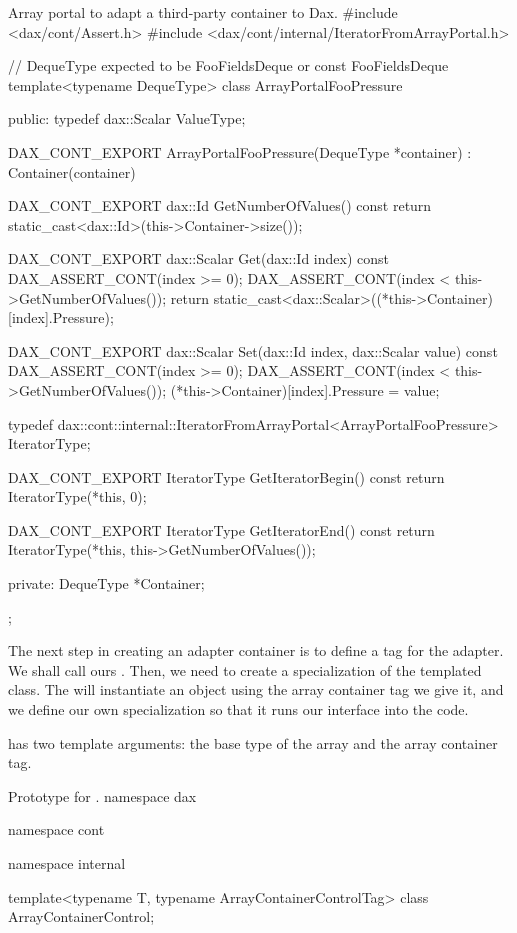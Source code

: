 \begin{daxexample}[ex:ArrayPortalAdapter]{Array portal to adapt a third-party container to Dax.}
#include <dax/cont/Assert.h>
#include <dax/cont/internal/IteratorFromArrayPortal.h>

// DequeType expected to be FooFieldsDeque or const FooFieldsDeque
template<typename DequeType>
class ArrayPortalFooPressure
{
public:
  typedef dax::Scalar ValueType;

  DAX_CONT_EXPORT
  ArrayPortalFooPressure(DequeType *container) : Container(container) {  }

  DAX_CONT_EXPORT
  dax::Id GetNumberOfValues() const {
    return static_cast<dax::Id>(this->Container->size());
  }

  DAX_CONT_EXPORT
  dax::Scalar Get(dax::Id index) const {
    DAX_ASSERT_CONT(index >= 0);
    DAX_ASSERT_CONT(index < this->GetNumberOfValues());
    return static_cast<dax::Scalar>((*this->Container)[index].Pressure);
  }

  DAX_CONT_EXPORT
  dax::Scalar Set(dax::Id index, dax::Scalar value) const {
    DAX_ASSERT_CONT(index >= 0);
    DAX_ASSERT_CONT(index < this->GetNumberOfValues());
    (*this->Container)[index].Pressure = value;
  }

  typedef dax::cont::internal::IteratorFromArrayPortal<ArrayPortalFooPressure> IteratorType;

  DAX_CONT_EXPORT
  IteratorType GetIteratorBegin() const {
    return IteratorType(*this, 0);
  }

  DAX_CONT_EXPORT
  IteratorType GetIteratorEnd() const {
    return IteratorType(*this, this->GetNumberOfValues());
  }

private:
  DequeType *Container;
};
\end{daxexample}

The next step in creating an adapter container is to define a tag for the
adapter. We shall call ours
. Then, we need to create a
specialization of the templated 
class. The  will instantiate an object using
the array container tag we give it, and we define our own specialization so
that it runs our interface into the code.

 has two template arguments: the
base type of the array and the array container tag.

\begin{daxexample}{Prototype for \protect{}.}
namespace dax {
namespace cont {
namespace internal {

template<typename T, typename ArrayContainerControlTag>
class ArrayContainerControl;

}
}
}
\end{daxexample}

